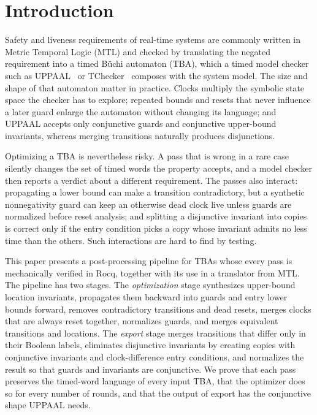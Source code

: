 \section{Introduction}
\label{sec:introduction}
Safety and liveness requirements of real-time systems are commonly written in Metric Temporal Logic (MTL) and checked by translating the negated requirement into a timed B\"uchi automaton (TBA), which a timed model checker such as UPPAAL~\cite{uppaal} or TChecker~\cite{tchecker} composes with the system model. The size and shape of that automaton matter in practice. Clocks multiply the symbolic state space the checker has to explore; repeated bounds and resets that never influence a later guard enlarge the automaton without changing its language; and UPPAAL accepts only conjunctive guards and conjunctive upper-bound invariants, whereas merging transitions naturally produces disjunctions.

Optimizing a TBA is nevertheless risky. A pass that is wrong in a rare case silently changes the set of timed words the property accepts, and a model checker then reports a verdict about a different requirement. The passes also interact: propagating a lower bound can make a transition contradictory, but a synthetic nonnegativity guard can keep an otherwise dead clock live unless guards are normalized before reset analysis; and splitting a disjunctive invariant into copies is correct only if the entry condition picks a copy whose invariant admits no less time than the others. Such interactions are hard to find by testing.

This paper presents a post-processing pipeline for TBAs whose every pass is mechanically verified in Rocq, together with its use in a translator from MTL. The pipeline has two stages. The \emph{optimization} stage synthesizes upper-bound location invariants, propagates them backward into guards and entry lower bounds forward, removes contradictory transitions and dead resets, merges clocks that are always reset together, normalizes guards, and merges equivalent transitions and locations. The \emph{export} stage merges transitions that differ only in their Boolean labels, eliminates disjunctive invariants by creating copies with conjunctive invariants and clock-difference entry conditions, and normalizes the result so that guards and invariants are conjunctive. We prove that each pass preserves the timed-word language of every input TBA, that the optimizer does so for every number of rounds, and that the output of export has the conjunctive shape UPPAAL needs.

